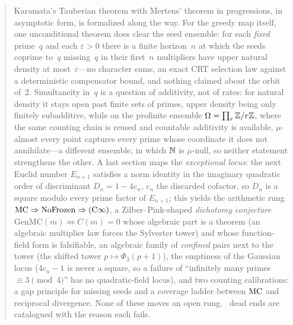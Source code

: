 \begin{abstract}
Karamata's Tauberian theorem with Mertens' theorem in progressions, in
asymptotic form, is formalized along the way.  For the greedy map itself, one unconditional
theorem does clear the seed ensemble: for each \emph{fixed} prime~$q$ and
each $\varepsilon>0$ there is a finite horizon~$n$ at which the seeds
coprime to~$q$ missing~$q$ in their first~$n$ multipliers have upper
natural density at most~$\varepsilon$---no character sums, an exact CRT
selection law against a deterministic compensator bound, and nothing
claimed about the orbit of~$2$.
Simultaneity in~$q$ is a question of additivity, not of rates: for natural
density it stays open past finite sets of primes, upper density being only
finitely subadditive, while on the profinite ensemble
$\Omega = \prod_{r} \ZZ/r\ZZ$, where the same counting chain is reused and
countable additivity is available, $\mu$-almost every point captures every
prime whose coordinate it does not annihilate---a different ensemble, in
which $\NN$ is $\mu$-null, so neither statement strengthens the other.
A last section maps the \emph{exceptional locus}: the next Euclid number
$E_{n+1}$ satisfies a norm identity in the imaginary quadratic order of
discriminant $D_n=1-4c_n$, $c_n$ the discarded cofactor, so $D_n$ is a
square modulo every prime factor of $E_{n+1}$; this yields the arithmetic rung
$\MC \Rightarrow \mathrm{NoFrozen} \Rightarrow (\mathrm{C}\infty)$, a
Zilber--Pink-shaped \emph{dichotomy conjecture} $\mathrm{GenMC}(m) \iff
C(m)=0$ whose algebraic part is a theorem (an algebraic multiplier law
forces the Sylvester tower) and whose function-field form is falsifiable,
an algebraic family of \emph{confined} pairs next to the tower (the shifted
tower $p \mapsto \Phi_3(p{+}1)$), the emptiness of the Gaussian locus
($4c_n-1$ is never a square, so a failure of ``infinitely many primes
$\equiv 3 \pmod 4$'' has no quadratic-field locus), and two counting
calibrations: a gap principle for missing seeds and a coverage ladder
between $\MC$ and reciprocal divergence.  None of these moves an open rung.
\DEentries~dead ends are catalogued with the reason each fails.
\end{abstract}

\smallskip{}
